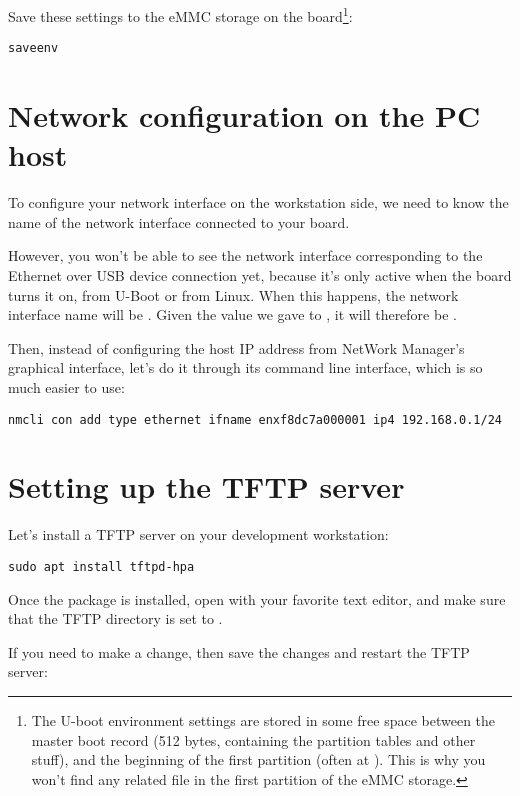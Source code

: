 Save these settings to the eMMC storage on the board\footnote{
The U-boot environment settings are stored in some free space
between the master boot record (512 bytes, containing the partition
tables and other stuff), and the beginning of the first partition (often
at ). This is why you won't find any related file in the
first partition of the eMMC storage.}:

\begin{verbatim}
saveenv
\end{verbatim}

\section{Network configuration on the PC host}

To configure your network interface on the workstation side, we need
to know the name of the network interface connected to your board.

However,  you won't be able to see the network interface corresponding
to the Ethernet over USB device connection yet, because it's only active when
the board turns it on, from U-Boot or from Linux. When this
happens, the network interface name will be .
Given the value we gave to , it will
therefore be .

Then, instead of configuring the host IP address from NetWork Manager's
graphical interface, let's do it through its command line interface,
which is so much easier to use:

\begin{verbatim}
nmcli con add type ethernet ifname enxf8dc7a000001 ip4 192.168.0.1/24
\end{verbatim}

\section{Setting up the TFTP server}

Let's install a TFTP server on your development workstation:

\begin{verbatim}
sudo apt install tftpd-hpa
\end{verbatim}

Once the package is installed, open  with your favorite
text editor, and make sure that the TFTP directory is set to .

If you need to make a change, then save the changes and restart the TFTP server:

